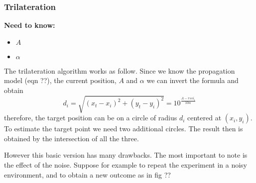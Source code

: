 \documentclass[12pt]{article}
\begin{document}
\subsubsection{Trilateration}

  \begin{center}
  \textbf{Need to know:}
  \begin{itemize}
    \centering
    \item $A$
    \item $\alpha$
  \end{itemize}
  \end{center}
The trilateration algorithm works as follow. Since we know the propagation model (eqn ??), the current position, $A$ and $\alpha$ we can invert the formula and obtain
\begin{equation}
    d_i=\sqrt{(x_t-x_i)^2+(y_t-y_i)^2}=10^{\frac{A-rssi_i}{10\alpha}}    
\end{equation}
therefore, the target position can be on a circle of radius $d_i$ centered at $(x_i,y_i)$. 
To estimate the target point we need two additional circles. The result then is obtained by the intersection of all the three.
\begin{center}
\end{center}
However this basic version has many drawbacks. The most important to note is the effect of the noise. Suppose for example to repeat the experiment in a noisy environment, and to obtain a new outcome as in fig ??
\end{document}
